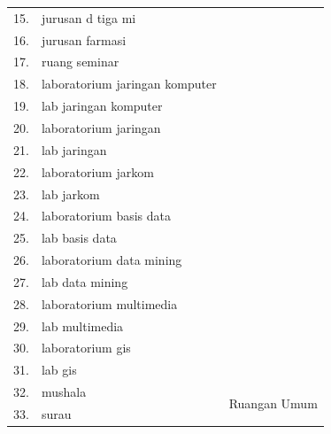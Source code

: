 \begin{enumerate}
\begin{longtable}[c]{|l|l|c|}
15.          & jurusan d tiga mi              &                                          \\ \cline{1-2}
16.          & jurusan farmasi                &                                          \\ \cline{1-2}
17.          & ruang seminar                  &                                          \\ \cline{1-2}
18.          & laboratorium jaringan komputer &                                          \\ \cline{1-2}
19.          & lab jaringan komputer          &                                          \\ \cline{1-2}
20.          & laboratorium jaringan          &                                          \\ \cline{1-2}
21.          & lab jaringan                   &                                          \\ \cline{1-2}
22.          & laboratorium jarkom            &                                          \\ \cline{1-2}
23.          & lab jarkom                     &                                          \\ \cline{1-2}
24.          & laboratorium basis data        &                                          \\ \cline{1-2}
25.          & lab basis data                 &                                          \\ \cline{1-2}
26.          & laboratorium data mining       &                                          \\ \cline{1-2}
27.          & lab data mining                &                                          \\ \cline{1-2}
28.          & laboratorium multimedia        &                                          \\ \cline{1-2}
29.          & lab multimedia                 &                                          \\ \cline{1-2}
30.          & laboratorium gis               &                                          \\ \cline{1-2}
31.          & lab gis                        &                                          \\ \hline
32.          & mushala                        & \multirow{25}{*}{Ruangan Umum}           \\ \cline{1-2}
33.          & surau                          &                                          \\ \cline{1-2}

\end{longtable}
\end{enumerate}
